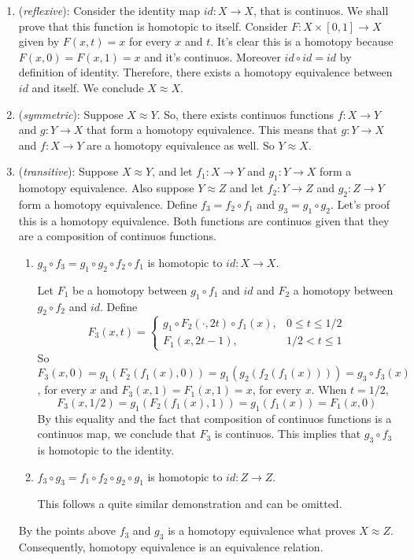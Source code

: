 \begin{enumerate}
    \item (\textit{reflexive}): Consider the identity map $id: X \to X$,
    that is continuos.
    We shall prove that this function is homotopic to itself. Consider $F : X
    \times [0,1] \to X$ given by $F(x,t) = x$ for every $x$ and $t$. It's
    clear this is a homotopy because $F(x,0) = F(x,1) = x$ and it's continuos. Moreover
    $id \circ id = id$ by definition of identity. Therefore, there exists a
    homotopy equivalence between $id$ and itself. We conclude $X \approx X$.  

    \item (\textit{symmetric}): Suppose $X \approx Y$. So, there exists
    continuos functions $f: X \to Y$ and $g: Y \to X$ that form a homotopy
    equivalence. This means that $g: Y \to X$ and $f: X \to Y$ are a homotopy
    equivalence as well. So $Y \approx X$.

    \item (\textit{transitive}): Suppose $X \approx Y$, and let $f_1 : X \to
    Y$ and $g_1: Y \to X$
    form a homotopy equivalence. Also suppose $Y \approx Z$ and
    let $f_2: Y \to Z$ and $g_2: Z \to Y$ form a homotopy equivalence.
    Define $f_3 = f_2 \circ f_1$ and $g_3 = g_1 \circ g_2$. Let's proof this
    is a homotopy equivalence. Both functions are continuos given that they
    are a composition of continuos functions. 

    \begin{enumerate}
        \item $g_3 \circ f_3 = g_1 \circ g_2 \circ f_2 \circ f_1$ is homotopic
        to $id: X \to X$.

        Let $F_1$ be a homotopy between $g_1 \circ f_1$ and $id$ and $F_2$ a
        homotopy between $g_2 \circ f_2$ and $id$. Define 
        $$
        F_3(x,t) = \begin{cases}
            g_1 \circ F_2(\cdot,2t)\circ f_1(x), &0 \le t \le 1/2 \\
            F_1(x, 2t - 1), &1/2 < t \le 1
        \end{cases}
        $$
        So $F_3(x,0) = g_1(F_2(f_1(x),0)) = g_1(g_2(f_2(f_1(x)))) = g_3 \circ
        f_3(x)$, for every $x$ and 
        $F_3(x,1) = F_1(x,1) = x$, for every $x$. When $t = 1/2$, 
        $$F_3(x, 1/2) = g_1(F_2(f_1(x), 1)) = g_1(f_1(x)) = F_1(x,0)$$
        By this equality and the fact that composition of continuos
        functions is a continuos map, we conclude that $F_3$ is continuos.
        This implies that $g_3\circ f_3$ is homotopic to the identity.

        \item $f_3 \circ g_3 = f_1 \circ f_2 \circ g_2 \circ g_1$ is homotopic
        to $id: Z \to Z$.

       This follows a quite similar demonstration and can be omitted. 

    \end{enumerate}

    By the points above $f_3$ and $g_3$ is a homotopy equivalence what proves
    $X \approx Z$.  Consequently, homotopy equivalence is an equivalence relation.
  
\end{enumerate}

